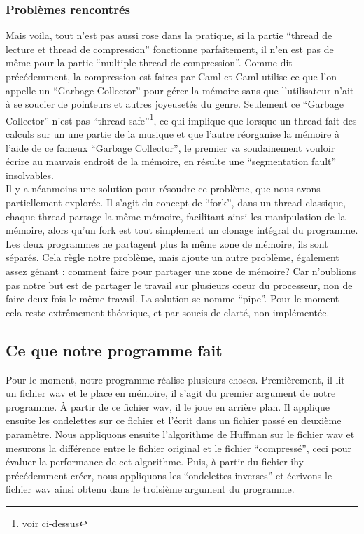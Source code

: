 \documentclass[a4paper,12pt]{article}
\begin{document}
		\subsubsection{Problèmes rencontrés}
Mais voila,  tout n'est  pas aussi rose dans la  pratique,  si la partie
``thread de lecture et  thread de compression'' fonctionne parfaitement,
il  n'en  est   pas  de  même  pour  la   partie  ``multiple  thread  de
compression''.  Comme dit  précédemment,  la compression est  faites par
Caml et Caml  utilise ce que l'on appelle  un ``Garbage Collector'' pour
gérer la mémoire sans que l'utilisateur  n'ait à se soucier de pointeurs
et autres joyeusetés du genre.  Seulement ce ``Garbage Collector'' n'est
pas  ``thread-safe''\footnote{voir  ci-dessus},   ce  qui  implique  que
lorsque un thread  fait des calculs sur  un une partie de  la musique et
que  l'autre réorganise  la mémoire  à  l'aide  de  ce  fameux ``Garbage
Collector'',  le  premier  va  soudainement  vouloir  écrire  au mauvais
endroit  de   la  mémoire,   en   résulte  une   ``segmentation  fault''
insolvables.\\
Il y a néanmoins une solution pour résoudre ce problème,  que nous avons
partiellement  explorée.  Il s'agit  du  concept  de  ``fork'',  dans un
thread  classique,  chaque thread  partage la  même mémoire,  facilitant
ainsi  les  manipulation  de  la  mémoire,  alors  qu'un  fork  est tout
simplement  un clonage  intégral du  programme.  Les deux  programmes ne
partagent plus la  même zone de mémoire,  ils  sont séparés.  Cela règle
notre problème,  mais ajoute un autre problème, également assez génant :
comment faire  pour partager  une zone  de mémoire?  Car  n'oublions pas
notre but est de partager le  travail sur plusieurs coeur du processeur,
non de faire deux fois le  même travail.  La solution se nomme ``pipe''.
Pour  le moment  cela reste  extrêmement  théorique,  et  par  soucis de
clarté, non implémentée.\\

	\subsection{Ce que notre programme fait}
Pour le moment, notre programme réalise plusieurs choses. Premièrement,
il lit un fichier wav et le place en mémoire, il s'agit du premier
argument de notre programme. À partir de ce fichier wav, il le joue en
arrière plan. Il applique ensuite les ondelettes sur ce fichier et
l'écrit dans un fichier passé en deuxième paramètre. Nous appliquons
ensuite l'algorithme de Huffman sur le fichier wav et mesurons la
différence entre le fichier original et le fichier ``compressé'', ceci
pour évaluer la performance de cet algorithme. Puis, à partir du fichier
ihy précédemment créer, nous appliquons les ``ondelettes inverses'' et
écrivons le fichier wav ainsi obtenu dans le troisième argument du
programme.\\
\end{document}

